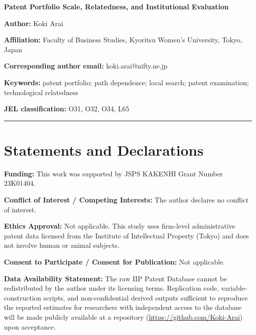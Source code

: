 \documentclass[12pt]{article}
\begin{document}
\thispagestyle{empty}

\begin{center}
{\LARGE \textbf{Patent Portfolio Scale, Relatedness, and Institutional Evaluation}}
\end{center}

\vspace{1cm}

\noindent \textbf{Author:} Koki Arai

\noindent \textbf{Affiliation:} Faculty of Business Studies, Kyoritsu Women's University, Tokyo, Japan

\noindent \textbf{Corresponding author email:} koki.arai@nifty.ne.jp

\vspace{0.5cm}

\noindent \textbf{Keywords:} patent portfolio; path dependence; local search; patent examination; technological relatedness

\noindent \textbf{JEL classification:} O31, O32, O34, L65

\vspace{1cm}
\hrule
\vspace{0.5cm}

\section*{Statements and Declarations}

\noindent \textbf{Funding:} This work was supported by JSPS KAKENHI Grant Number 23K01404.

\vspace{0.3cm}
\noindent \textbf{Conflict of Interest / Competing Interests:} The author declares no conflict of interest.

\vspace{0.3cm}
\noindent \textbf{Ethics Approval:} Not applicable. This study uses firm-level administrative patent data licensed from the Institute of Intellectual Property (Tokyo) and does not involve human or animal subjects.

\vspace{0.3cm}
\noindent \textbf{Consent to Participate / Consent for Publication:} Not applicable.

\vspace{0.3cm}
\noindent \textbf{Data Availability Statement:} The raw IIP Patent Database cannot be redistributed by the author under its licensing terms. Replication code, variable-construction scripts, and non-confidential derived outputs sufficient to reproduce the reported estimates for researchers with independent access to the database will be made publicly available at a repository (\url{https://github.com/Koki-Arai}) upon acceptance.
\end{document}
